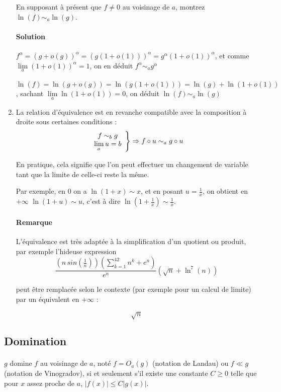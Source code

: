 \documentclass[]{article}
\begin{document}
\begin{enumerate}
	En supposant à présent que $f \ne 0$ au voisinage de $a$, montrez $\ln(f) \sim_a \ln(g)$.
	
	\paragraph{Solution}
	$f^\alpha = (g+o(g))^\alpha = (g(1+o(1)))^\alpha=g^\alpha (1+o(1))^\alpha$, et comme $\lim\limits_{a} (1+o(1))^\alpha = 1$, on en déduit $f^\alpha \sim_a g^\alpha$
	
	$\ln(f)=\ln(g+o(g))=\ln(g(1+o(1)))=\ln(g)+\ln(1+o(1))$, sachant $\lim\limits_{a} \ln(1+o(1))=0$, on déduit $\ln(f) \sim_a \ln(g)$
	
	\item La relation d'équivalence est en revanche compatible avec la composition à droite sous certaines conditions :
		$$\left. \begin{array}{c c}
				f \sim_b g \\
				\lim\limits_{a} u=b\\
			\end{array} \right\} \Rightarrow f \circ u \sim_a g \circ u$$
	
	En pratique, cela signifie que l'on peut effectuer un changement de variable tant que la limite de celle-ci reste la même.
	
	Par exemple, en $0$ on a $\ln(1+x) \sim x$, et en posant $u=\frac{1}{x}$, on obtient en $+\infty$ $\ln(1+u)\sim u$, c'est à dire $\ln\left(1+\frac{1}{x}\right) \sim \frac{1}{x}$.
	
	\paragraph{Remarque}
	L'équivalence est très adaptée à la simplification d'un quotient ou produit, par exemple l'hideuse expression
	$$\frac{\left(n \, sin \left(\frac{1}{n}\right)\right)\left(\displaystyle \sum_{k=1}^{42} n^k + e^n\right)}{e^{n}} \left(\sqrt{n} + \ln^7(n)\right)$$
	
	peut être remplacée selon le contexte (par exemple pour un calcul de limite) par un équivalent en $+\infty$ :
	
	$$\sqrt{n}$$
\end{enumerate}

\subsection{Domination}

\paragraph[Définition]{}
$g$ domine $f$ au voisinage de $a$, noté $f=O_a(g)$ (notation de Landau) ou $f \ll g$ (notation de Vinogradov), si et seulement s'il existe une constante $C \geqslant 0$ telle que pour $x$ assez proche de $a$, $|f(x)| \leqslant C|g(x)|$.
\end{document}
